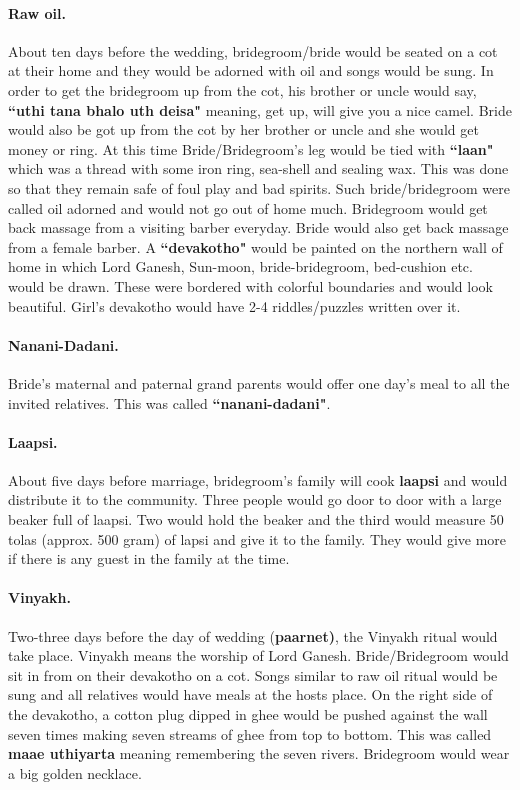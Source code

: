 \paragraph{Raw oil.} About ten days before the wedding, bridegroom/bride would be
seated on a cot at their home and they would be adorned with oil and songs
would be sung. In order to get the bridegroom up from the cot, his brother or uncle
would say, \textbf{``uthi tana bhalo uth deisa"} meaning, get up, will give you
a nice camel. Bride would also be got up from the cot by her brother or uncle
and she would get money or ring. At this time Bride/Bridegroom's leg would be tied
with \textbf{``laan"} which was a thread with some iron ring, sea-shell and
sealing wax. This was done so that they remain safe of foul play and bad
spirits. Such bride/bridegroom were called oil adorned and would not go out of home
much. Bridegroom would get back massage from a visiting barber everyday. Bride would
also get back massage from a female barber. A \textbf{``devakotho"} would be
painted on the northern wall of home in which Lord Ganesh, Sun-moon,
bride-bridegroom, bed-cushion etc. would be drawn. These were bordered with colorful
boundaries and would look beautiful. Girl's devakotho would have 2-4
riddles/puzzles written over it.

\paragraph{Nanani-Dadani.} Bride's maternal and paternal grand parents would
offer one day's meal to all the invited relatives. This was called
\textbf{``nanani-dadani"}.

\paragraph{Laapsi.} About five days before marriage, bridegroom's family will cook
\textbf{laapsi} and would distribute it to the community. Three people would go
door to door with a large beaker full of laapsi. Two would hold the beaker and
the third would measure 50 tolas (approx. 500 gram) of lapsi and give it to the
family. They would give more if there is any guest in the family at the time.

\paragraph{Vinyakh.} Two-three days before the day of wedding (\textbf{paarnet)},
the Vinyakh ritual would take place. Vinyakh means the worship of Lord Ganesh.
Bride/Bridegroom would sit in from on their devakotho on a cot. Songs similar to raw
oil ritual would be sung and all relatives would have meals at the hosts place.
On the right side of the devakotho, a cotton plug dipped in ghee would be
pushed against the wall seven times making seven streams of ghee from top to
bottom. This was called \textbf{maae uthiyarta} meaning remembering the seven
rivers. Bridegroom would wear a big golden necklace.  

